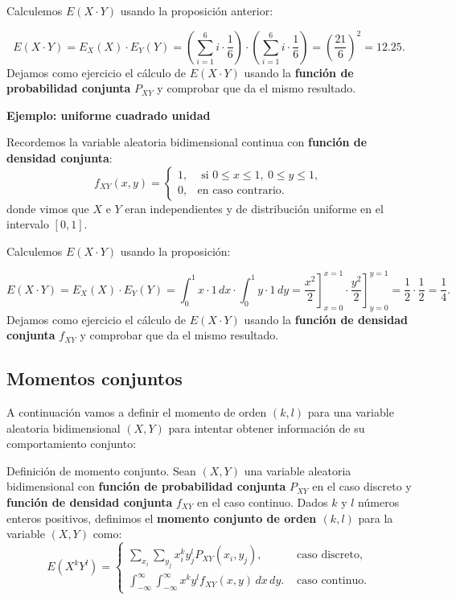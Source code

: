 \documentclass[]{book}
\begin{document}
Calculemos \(E(X\cdot Y)\) usando la proposición anterior:

\[
E(X\cdot Y)=E_X(X)\cdot E_Y(Y)=\left(\sum_{i=1}^6 i\cdot \frac{1}{6}\right)\cdot \left(\sum_{i=1}^6 i\cdot \frac{1}{6}\right)=\left(\frac{21}{6}\right)^2 = 12.25.
\]
Dejamos como ejercicio el cálculo de \(E(X\cdot Y)\) usando la \textbf{función de probabilidad conjunta} \(P_{XY}\) y comprobar que da el mismo resultado.

\textbf{Ejemplo: uniforme cuadrado unidad}

Recordemos la variable aleatoria bidimensional continua con \textbf{función de densidad conjunta}:
\[
f_{XY}(x,y)=\begin{cases}
1, & \mbox{ si }0\leq x\leq 1,\ 0\leq y\leq 1, \\
0, & \mbox{en caso contrario.}
\end{cases}
\]
donde vimos que \(X\) e \(Y\) eran independientes y de distribución uniforme en el intervalo \([0,1]\).

Calculemos \(E(X\cdot Y)\) usando la proposición:

\[
E(X\cdot Y)=E_X(X)\cdot E_Y(Y)=\int_0^1 x\cdot 1\, dx\cdot \int_0^1 y\cdot 1\, dy =\left.\frac{x^2}{2}\right]_{x=0}^{x=1}\cdot \left.\frac{y^2}{2}\right]_{y=0}^{y=1}=\frac{1}{2}\cdot \frac{1}{2}=\frac{1}{4}.
\]
Dejamos como ejercicio el cálculo de \(E(X\cdot Y)\) usando la \textbf{función de densidad conjunta} \(f_{XY}\) y comprobar que da el mismo resultado.

\hypertarget{momentos-conjuntos}{%
\subsection{Momentos conjuntos}\label{momentos-conjuntos}}

A continuación vamos a definir el momento de orden \((k,l)\) para una variable aleatoria bidimensional \((X,Y)\) para intentar obtener información de su comportamiento conjunto:

Definición de momento conjunto.
Sean \((X,Y)\) una variable aleatoria bidimensional con \textbf{función de probabilidad conjunta} \(P_{XY}\) en el caso discreto y \textbf{función de densidad conjunta} \(f_{XY}\) en el caso continuo. Dados \(k\) y \(l\) números enteros positivos, definimos el \textbf{momento conjunto de orden \((k,l)\)} para la variable \((X,Y)\) como:
\[
E\left(X^k Y^l\right)=\begin{cases}
\sum_{x_i}\sum_{y_j} x_i^k y_j^l P_{XY}(x_i,y_j), & \mbox{ caso discreto,} \\
\int_{-\infty}^\infty\int_{-\infty}^\infty x^k y^l f_{XY}(x,y)\, dx\, dy. & \mbox{ caso continuo.}
\end{cases}
\]
\end{document}

